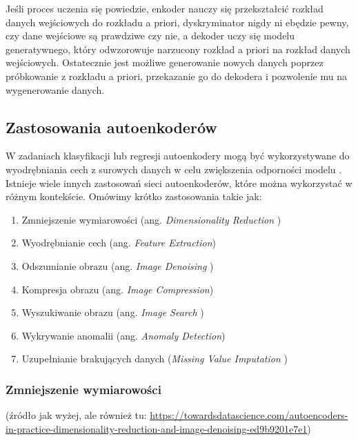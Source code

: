 \documentclass[12pt]{mwbk}
\theoremstyle{plain}
\theoremstyle{definition}
\theoremstyle{remark}
\begin{document}
Jeśli proces uczenia się powiedzie, enkoder nauczy się przekształcić rozkład danych wejściowych do rozkładu a priori,  dyskryminator nigdy ni ebędzie pewny, czy dane wejściowe są prawdziwe czy nie, a dekoder uczy się modelu generatywnego, który odwzorowuje narzucony rozkład a priori na rozkład danych wejściowych. Ostatecznie jest możliwe generowanie nowych danych poprzez próbkowanie z rozkładu a priori, przekazanie go do dekodera i pozwolenie mu na wygenerowanie danych.




\subsection{Zastosowania autoenkoderów}




W zadaniach klasyfikacji lub regresji autoenkodery mogą być wykorzystywane do wyodrębniania cech z surowych danych w celu zwiększenia odporności modelu \cite{kumar}. Istnieje wiele innych zastosowań sieci autoenkoderów, które można wykorzystać w różnym kontekście. Omówimy krótko zastosowania takie jak:
\begin{enumerate}
\item  Zmniejszenie wymiarowości (ang. \emph{Dimensionality Reduction })

\item  Wyodrębnianie cech (ang. \emph{Feature Extraction})

\item  Odszumianie obrazu (ang. \emph{Image Denoising })

\item  Kompresja obrazu (ang. \emph{Image Compression})

\item Wyszukiwanie obrazu (ang. \emph{ Image Search })

\item Wykrywanie anomalii (ang. \emph{ Anomaly Detection})

\item  Uzupełnianie brakujących danych (\emph{Missing Value Imputation })

\end{enumerate}

\subsubsection{Zmniejszenie wymiarowości}

(źródło jak wyżej, ale również tu: \url{https://towardsdatascience.com/autoencoders-in-practice-dimensionality-reduction-and-image-denoising-ed9b9201e7e1})
\end{document}
